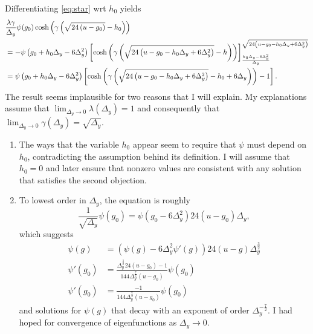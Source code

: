 \documentclass[twocolumn]{article}
\begin{document}
\newpage

Differentiating \eqref{eq:star}  wrt $h_0$ yields
\newcommand{\temp}{g_0 + h_0 \Delta_y - 6 \Delta_y^2}
\newcommand{\mtemp}{-g_0 - h_0 \Delta_y + 6 \Delta_y^2}
\begin{align}
  & \frac{\lambda \gamma}{\Delta_y} \psi(g_0) \cosh \left( \gamma
    \left( \Rad{-g_0} - h_0 \right) \right) \nonumber \\
  &= - \psi\left( \temp \right)
  \left[ \cosh
    \left( \gamma
      \left( \Rad{\mtemp} - h \right)
    \right)
  \right]^{\Rad{\mtemp}}_ {\frac{h_0 \Delta_y - 6
      \Delta_y^2}{\Delta_y}} \nonumber \\
  \label{eq:DEG}
  &= \psi\left( \temp \right)
  \left[ \cosh
    \left( \gamma
      \left( \Rad{\mtemp} - h_0 + 6 \Delta_y \right)
    \right) -1
  \right].
\end{align}
The result seems implausible for two reasons that I will explain.  My
explanations assume that $\lim_{\Delta_y \rightarrow 0}
\lambda(\Delta_y) = 1$ and consequently that $\lim_{\Delta_y
  \rightarrow 0} \gamma(\Delta_y) = \sqrt{\Delta_y}$.
\begin{enumerate}
\item The ways that the variable $h_0$ appear seem to require that
  $\psi$ must depend on $h_0$, contradicting the assumption behind its
  definition.  I will assume that $h_0=0$ and later ensure that
  nonzero values are consistent with any solution that satisfies the
  second objection.
\item To lowest order in $\Delta_y$, the equation is roughly
  \begin{equation*}
    \frac{1}{\sqrt{\Delta_y}} \psi(g_0) = \psi(g_0 - 6\Delta_y^2)
    24(u-g_0) \Delta_y,
  \end{equation*}
  which suggests
  \begin{align*}
    \psi(g) &= \left( \psi(g) - 6\Delta_y^2 \psi'(g) \right) 24(u-g)
    \Delta_y^{\frac{3}{2}} \\
    \psi'(g_0) &= \frac{\Delta_y^{\frac{3}{2}} 24 (u-g_0) - 1} {144
      \Delta_y^{\frac{7}{2}} (u-g_0)} \psi(g_0) \\
    \psi'(g_0) &= \frac{- 1} {144 \Delta_y^{\frac{7}{2}} (u-g_0)} \psi(g_0)
  \end{align*}
  and solutions for $\psi(g)$ that decay with an exponent of order
  $\Delta_y^{ - \frac{7}{2}}$.  I had hoped for convergence of
  eigenfunctions as $\Delta_y \rightarrow 0$.
\end{enumerate}
\end{document}
